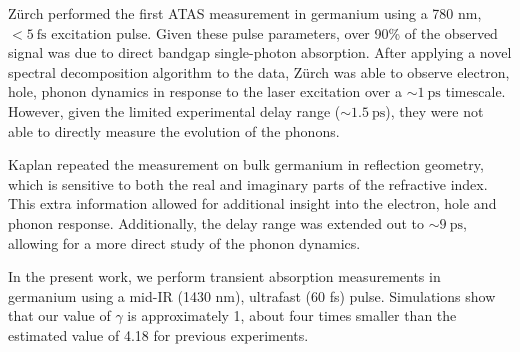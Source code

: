 Z\"{u}rch performed the first ATAS measurement in germanium using a 780 nm, $<5 \ \textrm{fs}$ excitation pulse. Given these pulse parameters, over 90\% of the observed signal was due to direct bandgap single-photon absorption. After applying a novel spectral decomposition algorithm to the data, Z\"{u}rch was able to observe electron, hole, phonon dynamics in response to the laser excitation over a $\sim 1 \ \textrm{ps}$ timescale. However, given the limited experimental delay range ($\sim 1.5 \ \textrm{ps}$), they were not able to directly measure the evolution of the phonons.

Kaplan repeated the measurement on bulk germanium in reflection geometry, which is sensitive to both the real and imaginary parts of the refractive index. This extra information allowed for additional insight into the electron, hole and phonon response. Additionally, the delay range was extended out to $\sim 9 \ \textrm{ps}$, allowing for a more direct study of the phonon dynamics.

In the present work, we perform transient absorption measurements in germanium using a mid-IR (1430 nm), ultrafast (60 fs) pulse. Simulations show that our value of $\gamma$ is approximately 1, about four times smaller than the estimated value of 4.18 for previous experiments.



